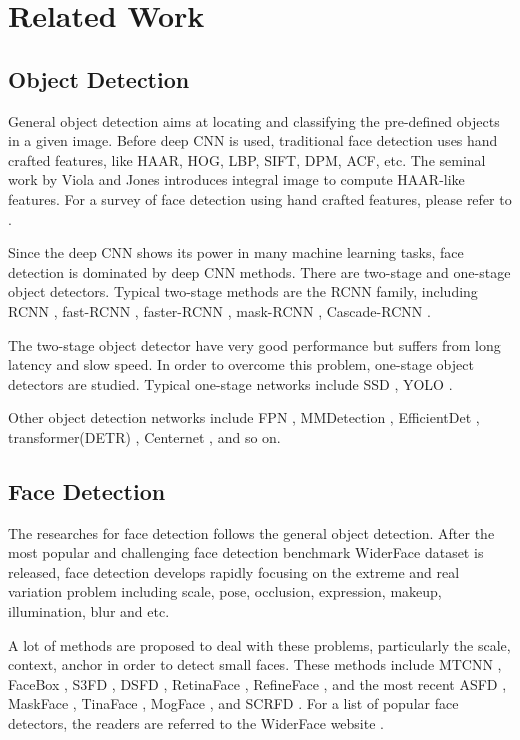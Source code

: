 \documentclass[conference]{IEEEtran}
\begin{document}
\section{Related Work}

\subsection {Object Detection}

General object detection aims at locating and classifying the pre-defined objects in a given image. Before deep CNN is used, traditional face detection uses hand crafted features, like HAAR, HOG, LBP, SIFT, DPM, ACF, etc. The seminal work by Viola and Jones \cite{VJ} introduces integral image to compute HAAR-like features. For a survey of face detection using hand crafted features, please refer to \cite{survey1,survey2}.       

Since the deep CNN shows its power in many machine learning tasks, face detection is dominated by deep CNN methods. There are two-stage and one-stage object detectors. Typical two-stage methods are the RCNN family, including RCNN \cite{RCNN}, fast-RCNN \cite{fast-RCNN}, faster-RCNN \cite{faster-RCNN}, mask-RCNN \cite{mask-RCNN}, Cascade-RCNN \cite{cascade-RCNN}. 

The two-stage object detector have very good performance but suffers from long latency and slow speed. In order to overcome this problem, one-stage object detectors are studied. Typical one-stage networks include SSD \cite{SSD}, YOLO \cite{YOLOv1, YOLOv2, YOLOv3, YOLOv4, YOLOv5}. 

Other object detection networks include FPN \cite{FPN}, MMDetection \cite{MMDetection}, EfficientDet \cite{EfficientDet}, transformer(DETR) \cite{DETR}, Centernet \cite{CenterNet,CenterNet2}, and so on. 

\subsection {Face Detection}

The researches for face detection follows the general object detection.  After the most popular and challenging face detection benchmark WiderFace dataset \cite{WiderFace} is released, face detection develops rapidly focusing on the extreme and real variation problem including scale, pose, occlusion, expression, makeup, illumination, blur and etc.

A lot of methods are proposed to deal with these problems, particularly the scale, context, anchor in order to detect small faces.  These methods include MTCNN \cite{MTCNN}, FaceBox \cite{FaceBox}, S3FD \cite{S3FD}, DSFD \cite{DSFD}, RetinaFace \cite{RetinaFace}, RefineFace \cite{RefineFace}, and the most recent ASFD \cite{ASFD}, MaskFace \cite{MaskFace}, TinaFace \cite{TinaFace}, MogFace \cite{MogFace}, and SCRFD \cite{SCRFD}. For a list of popular face detectors, the readers are referred to the WiderFace website \cite{WiderFaceWeb}.    
\end{document}
